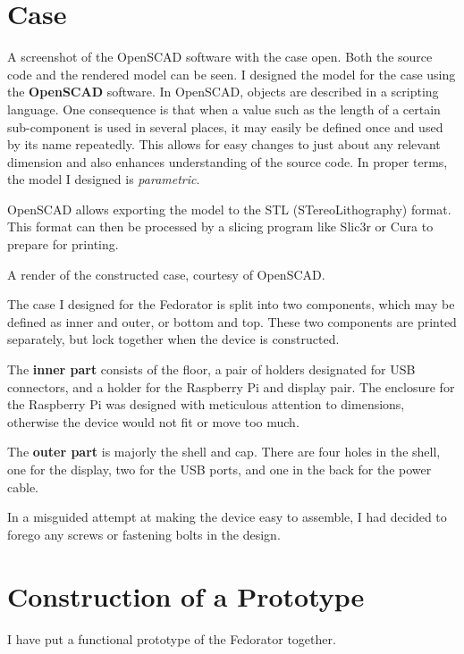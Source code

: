     \section{Case}
            {A screenshot of the OpenSCAD software with the case open.  Both the source code and the rendered model can be seen.}
        I designed the model for the case using the \textbf{OpenSCAD} software.  In OpenSCAD, objects are described in a scripting language.  One consequence is that when a value such as the length of a certain sub-component is used in several places, it may easily be defined once and used by its name repeatedly.  This allows for easy changes to just about any relevant dimension and also enhances understanding of the source code.  In proper terms, the model I designed is \textit{parametric}.
        
        OpenSCAD allows exporting the model to the STL (STereoLithography) format.  This format can then be processed by a slicing program like Slic3r or Cura to prepare for printing.
        
            {A render of the constructed case, courtesy of OpenSCAD.}
        
        The case I designed for the Fedorator is split into two components, which may be defined as inner and outer, or bottom and top.  These two components are printed separately, but lock together when the device is constructed.
        
        The \textbf{inner part} consists of the floor, a pair of holders designated for USB connectors, and a holder for the Raspberry Pi and display pair.  The enclosure for the Raspberry Pi was designed with meticulous attention to dimensions, otherwise the device would not fit or move too much.
        
        The \textbf{outer part} is majorly the shell and cap.  There are four holes in the shell, one for the display, two for the USB ports, and one in the back for the power cable.
        
        In a misguided attempt at making the device easy to assemble, I had decided to forego any screws or fastening bolts in the design.
        
        
    \section{Construction of a Prototype}
        I have put a functional prototype of the Fedorator together.
        
